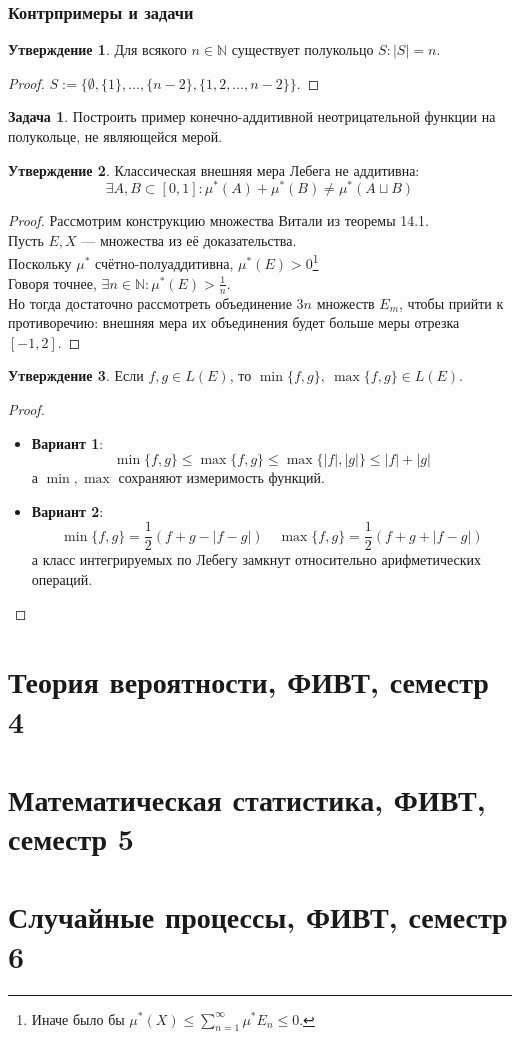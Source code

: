 \documentclass[11pt,a4paper]{report}
\def\Natural{\mathbb{N}}
\theoremstyle{definition}
\newtheorem{task}{Задача}[section]
\theoremstyle{definition}
\newtheorem{preposition}{Утверждение}[section]
\theoremstyle{definition}
\begin{document}
	\section{Контрпримеры и задачи}
	\begin{preposition}
		Для всякого $ n \in \Natural $ существует полукольцо $ S: |S| = n $.
	\end{preposition}
	\begin{proof}
		$ S := \{\emptyset, \{1\}, \dots, \{n-2\}, \{1, 2, \dots, n-2 \}\} $.
	\end{proof}
	\begin{task}
		Построить пример конечно-аддитивной неотрицательной функции на полукольце, не являющейся мерой.
	\end{task}
	\begin{preposition}
		Классическая внешняя мера Лебега не аддитивна:
		\[
			\exists A, B \subset [0, 1]: \mu^{*}(A) + \mu^{*}(B) \neq \mu^{*}(A \sqcup B)
		\] 
	\end{preposition}
	\begin{proof}
		Рассмотрим конструкцию множества Витали из теоремы 14.1.\\
		Пусть $ E, X $ — множества из её доказательства.\\
		Поскольку $ \mu^{*} $ счётно-полуаддитивна, $ \mu^{*}(E) > 0 $\footnote{Иначе было бы $ \mu^{*}(X) \le \sum\limits_{n=1}^{\infty}  \mu^{*} E_{n} \le 0 $.}\\
		Говоря точнее, $ \exists n \in \Natural: \mu^{*}(E) > \frac{1}{n} $.\\
		Но тогда достаточно рассмотреть объединение $ 3n $ множеств $ E_{m} $, чтобы прийти к противоречию: внешняя мера их объединения будет больше меры отрезка $ [-1, 2] $.
	\end{proof}
	\begin{preposition}
		Если $ f, g \in L(E) $, то $ \min\{f, g\},\ \max\{f, g\} \in L(E) $.
	\end{preposition}
	\begin{proof}$  $
		\begin{itemize}
			\item \textbf{Вариант 1}:\\
				\[ \min\{f, g\} \le \max\{f, g\} \le \max\{|f|, |g|\} \le |f| + |g| \] а $ \min, \max $ сохраняют измеримость функций.
			\item \textbf{Вариант 2}:
			\[ \min\{f, g\} = \frac{1}{2} (f + g - |f - g|)\quad \max\{f, g\} = \frac{1}{2} (f + g + |f - g|) \]
			а класс интегрируемых по Лебегу замкнут относительно арифметических операций.
		\end{itemize}
	\end{proof}
  \part{Теория вероятности, ФИВТ, семестр 4}
  \part{Математическая статистика, ФИВТ, семестр 5}
  \part{Случайные процессы, ФИВТ, семестр 6}
\end{document}
